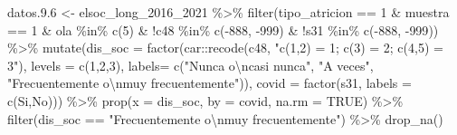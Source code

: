 \documentclass[
  12pt,
]{book}
\newenvironment{Shaded}{\begin{snugshade}}{\end{snugshade}}
\newcommand{\AttributeTok}[1]{\textcolor[rgb]{0.77,0.63,0.00}{#1}}
\newcommand{\ConstantTok}[1]{\textcolor[rgb]{0.00,0.00,0.00}{#1}}
\newcommand{\DecValTok}[1]{\textcolor[rgb]{0.00,0.00,0.81}{#1}}
\newcommand{\FloatTok}[1]{\textcolor[rgb]{0.00,0.00,0.81}{#1}}
\newcommand{\FunctionTok}[1]{\textcolor[rgb]{0.00,0.00,0.00}{#1}}
\newcommand{\NormalTok}[1]{#1}
\newcommand{\OtherTok}[1]{\textcolor[rgb]{0.56,0.35,0.01}{#1}}
\newcommand{\SpecialCharTok}[1]{\textcolor[rgb]{0.00,0.00,0.00}{#1}}
\newcommand{\StringTok}[1]{\textcolor[rgb]{0.31,0.60,0.02}{#1}}
\begin{document}
\begin{Shaded}
\begin{Highlighting}[]
\NormalTok{datos.}\FloatTok{9.6} \OtherTok{\textless{}{-}}\NormalTok{ elsoc\_long\_2016\_2021 }\SpecialCharTok{\%\textgreater{}\%} 
  \FunctionTok{filter}\NormalTok{(tipo\_atricion }\SpecialCharTok{==} \DecValTok{1} \SpecialCharTok{\&}\NormalTok{ muestra }\SpecialCharTok{==} \DecValTok{1} \SpecialCharTok{\&}\NormalTok{ ola }\SpecialCharTok{\%in\%} \FunctionTok{c}\NormalTok{(}\DecValTok{5}\NormalTok{) }\SpecialCharTok{\&} \SpecialCharTok{!}\NormalTok{c48 }\SpecialCharTok{\%in\%} \FunctionTok{c}\NormalTok{(}\SpecialCharTok{{-}}\DecValTok{888}\NormalTok{, }\SpecialCharTok{{-}}\DecValTok{999}\NormalTok{) }\SpecialCharTok{\&} \SpecialCharTok{!}\NormalTok{s31 }\SpecialCharTok{\%in\%} \FunctionTok{c}\NormalTok{(}\SpecialCharTok{{-}}\DecValTok{888}\NormalTok{, }\SpecialCharTok{{-}}\DecValTok{999}\NormalTok{)) }\SpecialCharTok{\%\textgreater{}\%} 
  \FunctionTok{mutate}\NormalTok{(}\AttributeTok{dis\_soc =} \FunctionTok{factor}\NormalTok{(car}\SpecialCharTok{::}\FunctionTok{recode}\NormalTok{(c48, }\StringTok{"c(1,2) = 1; c(3) = 2; c(4,5) = 3"}\NormalTok{),}
                               \AttributeTok{levels =} \FunctionTok{c}\NormalTok{(}\DecValTok{1}\NormalTok{,}\DecValTok{2}\NormalTok{,}\DecValTok{3}\NormalTok{),}
                               \AttributeTok{labels=} \FunctionTok{c}\NormalTok{(}\StringTok{"Nunca o}\SpecialCharTok{\textbackslash{}n}\StringTok{casi nunca"}\NormalTok{, }\StringTok{"A veces"}\NormalTok{,}
                                         \StringTok{"Frecuentemente o}\SpecialCharTok{\textbackslash{}n}\StringTok{muy frecuentemente"}\NormalTok{)),}
         \AttributeTok{covid =} \FunctionTok{factor}\NormalTok{(s31, }\AttributeTok{labels =} \FunctionTok{c}\NormalTok{(}\StringTok{\textquotesingle{}Si\textquotesingle{}}\NormalTok{,}\StringTok{\textquotesingle{}No\textquotesingle{}}\NormalTok{))) }\SpecialCharTok{\%\textgreater{}\%}
  \FunctionTok{prop}\NormalTok{(}\AttributeTok{x =}\NormalTok{ dis\_soc, }\AttributeTok{by =}\NormalTok{ covid, }\AttributeTok{na.rm =} \ConstantTok{TRUE}\NormalTok{) }\SpecialCharTok{\%\textgreater{}\%} 
  \FunctionTok{filter}\NormalTok{(dis\_soc }\SpecialCharTok{==} \StringTok{"Frecuentemente o}\SpecialCharTok{\textbackslash{}n}\StringTok{muy frecuentemente"}\NormalTok{) }\SpecialCharTok{\%\textgreater{}\%} 
  \FunctionTok{drop\_na}\NormalTok{()}


\end{Highlighting}
\end{Shaded}
\end{document}
